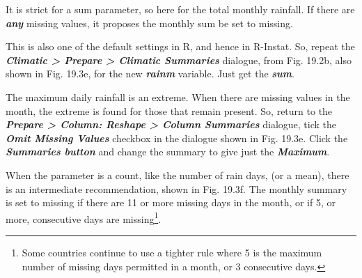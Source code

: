 \documentclass[
  letterpaper,
  DIV=11,
  numbers=noendperiod]{scrreprt}
\begin{document}
It is strict for a sum parameter, so here for the total monthly
rainfall. If there are \textbf{\emph{any}} missing values, it proposes
the monthly sum be set to missing.

This is also one of the default settings in R, and hence in R-Instat.
So, repeat the \textbf{\emph{Climatic \textgreater{} Prepare
\textgreater{} Climatic Summaries}} dialogue, from Fig. 19.2b, also
shown in Fig. 19.3e, for the new \textbf{\emph{rainm}} variable. Just
get the \textbf{\emph{sum}}.

The maximum daily rainfall is an extreme. When there are missing values
in the month, the extreme is found for those that remain present. So,
return to the \textbf{\emph{Prepare \textgreater{} Column: Reshape
\textgreater{} Column Summaries}} dialogue, tick the \textbf{\emph{Omit
Missing Values}} checkbox in the dialogue shown in Fig. 19.3e. Click the
\textbf{\emph{Summaries button}} and change the summary to give just the
\textbf{\emph{Maximum}}.

When the parameter is a count, like the number of rain days, (or a
mean), there is an intermediate recommendation, shown in Fig. 19.3f. The
monthly summary is set to missing if there are 11 or more missing days
in the month, or if 5, or more, consecutive days are missing\footnote{Some
  countries continue to use a tighter rule where 5 is the maximum number
  of missing days permitted in a month, or 3 consecutive days.}.
\end{document}
